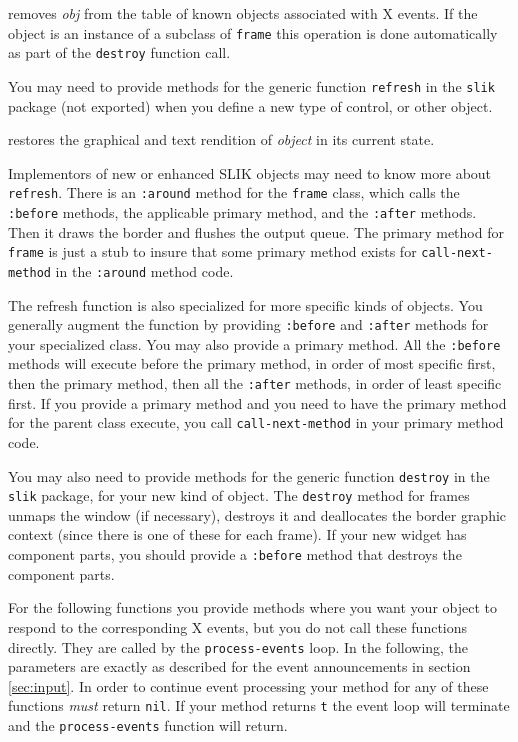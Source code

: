 \documentclass[twoside,openright,11pt]{report}
\newcommand{\tp}[1]{\texttt{#1}}
\begin{document}
{removes \emph{obj} from the table of known objects associated with X
events.  If the object is an instance of a subclass of \tp{frame}
this operation is done automatically as part of the \tp{destroy}
function call.}

You may need to provide methods for the generic function
\tp{refresh} in the \tp{slik} package (not exported) when you
define a new type of control, or other object.

{restores the graphical and text rendition of \textit{object} in its
current state.}

Implementors of new or enhanced SLIK objects may need to know more
about \tp{refresh}.  There is an \tp{:around} method for the
\tp{frame} class, which calls the \tp{:before} methods, the applicable
primary method, and the \tp{:after} methods.  Then it draws the border
and flushes the output queue.  The primary method for \tp{frame} is
just a stub to insure that some primary method exists for
\tp{call-next-method} in the \tp{:around} method code.

The refresh function is also specialized for more specific kinds of
objects.  You generally augment the function by providing
\tp{:before} and \tp{:after} methods for your specialized
class.  You may also provide a primary method.  All the
\tp{:before} methods will execute before the primary method, in
order of most specific first, then the primary method, then all the
\tp{:after} methods, in order of least specific first.  If you
provide a primary method and you need to have the primary method for
the parent class execute, you call \tp{call-next-method} in your
primary method code.

You may also need to provide methods for the generic function
\tp{destroy} in the \tp{slik} package, for your new kind of
object.  The \tp{destroy} method for frames unmaps the window (if
necessary), destroys it and deallocates the border graphic context
(since there is one of these for each frame).  If your new widget has
component parts, you should provide a \tp{:before} method that
destroys the component parts.

For the following functions you provide methods where you want your
object to respond to the corresponding X events, but you do not call
these functions directly.  They are called by the \tp{process-events}
loop.  In the following, the parameters are exactly as described for
the event announcements in section \ref{sec:input}.  In order to
continue event processing your method for any of these functions
\emph{must} return \tp{nil}.  If your method returns \tp{t} the event
loop will terminate and the \tp{process-events} function will return.
\end{document}
